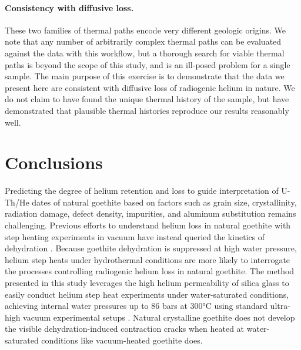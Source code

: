 \paragraph{Consistency with diffusive loss.} These two families of thermal paths encode very different geologic origins. We 
note that any number of arbitrarily complex thermal paths can be evaluated against the data with 
this workflow, but a thorough search for viable thermal paths is beyond the scope 
of this study, and is an ill-posed problem for a single sample. The main purpose of this exercise 
is to demonstrate that the data we present here are consistent with diffusive loss of 
radiogenic helium in nature. We do not claim to have found the unique thermal history of the sample, but 
have demonstrated that plausible thermal histories reproduce our results reasonably well.

\section{Conclusions}\label{conclusions}

Predicting the degree of helium retention and loss to guide
interpretation of U-Th/He dates of natural goethite based on factors
such as grain size, crystallinity, radiation damage, defect density,
impurities, and aluminum substitution remains challenging. Previous
efforts to understand helium loss in natural goethite with step heating
experiments in vacuum have instead queried the kinetics of dehydration
\citep{farley2024}. Because goethite dehydration is suppressed at high water pressure, 
helium step heats under hydrothermal
conditions are more likely to interrogate the processes controlling
radiogenic helium loss in natural goethite. The method
presented in this study leverages the high helium permeability of silica glass to easily
conduct helium step heat experiments under water-saturated conditions,
achieving internal water pressures up to 86 bars at 300°C using standard
ultra-high vacuum experimental setups \citep{farley1999}. Natural crystalline goethite does not develop the
visible dehydration-induced contraction cracks when heated at water-saturated conditions like vacuum-heated goethite does. 


